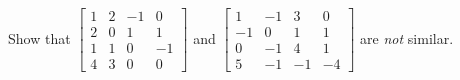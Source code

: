 \documentclass{ximera}
\begin{document}
   
  
   
  \begin{problem}\label{prob:notsimilar_4x4}
  Show that $\begin{bmatrix}
  1 & 2 & -1 &  0 \\
  2 & 0 &  1 &  1 \\
  1 & 1 &  0 & -1 \\
  4 & 3 & 0 & 0
  \end{bmatrix}$ and $
  \begin{bmatrix}
    1 & -1 &  3 &  0 \\
   -1 &  0 &  1 &  1 \\
    0 & -1 &  4 &  1 \\
    5 & -1 & -1 & -4
  \end{bmatrix}$ are \textit{not} similar.
  \end{problem}
\end{document}
